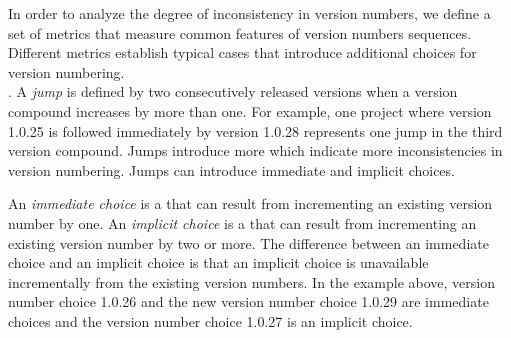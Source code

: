 \documentclass[conference]{IEEEtran}
\begin{document}
 







In order to analyze the degree of inconsistency in version numbers, we define 
a set of metrics that measure common features of version numbers sequences. Different metrics establish typical cases that introduce additional choices for version numbering. \\
 
 
 
 
. A \emph{jump} is defined by two consecutively released versions when a version compound increases by more than one.
For example, one project where version 1.0.25 is followed immediately by version 1.0.28 represents one jump in the third version compound. 
Jumps introduce more \choices which indicate more inconsistencies in version numbering. 
Jumps can introduce immediate and implicit choices.

An \emph{immediate choice} is a \choice that can result from incrementing an existing version number by one. 
An \emph{implicit choice} is a \choice that can result from incrementing an existing version number by two or more.
The difference between an immediate choice and an implicit choice is that an implicit choice is unavailable incrementally from the existing version numbers. 
In the example above, version number choice 1.0.26 and the new version number choice 1.0.29 are immediate choices and the version number choice 1.0.27 is an implicit choice.
\\
 
\end{document}
